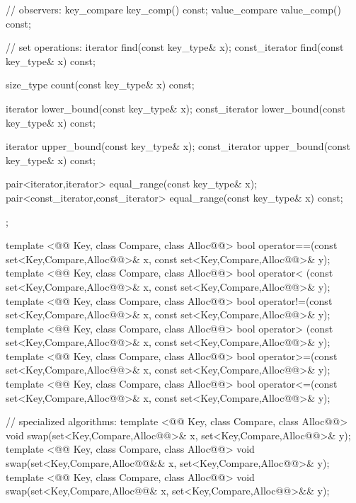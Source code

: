 \documentclass[american,twoside]{book}
\begin{document}
\begin{codeblock}
{{    // observers:
    key_compare   key_comp() const;
    value_compare value_comp() const;

    // set operations:
    iterator        find(const key_type& x);
    const_iterator  find(const key_type& x) const;

    size_type count(const key_type& x) const;

    iterator        lower_bound(const key_type& x);
    const_iterator  lower_bound(const key_type& x) const;

    iterator        upper_bound(const key_type& x);
    const_iterator  upper_bound(const key_type& x) const;

    pair<iterator,iterator>             equal_range(const key_type& x);
    pair<const_iterator,const_iterator> equal_range(const key_type& x) const;
  };

  template <@@ Key, class Compare, class Alloc@@>
    bool operator==(const set<Key,Compare,Alloc@@>& x,
                    const set<Key,Compare,Alloc@@>& y);
  template <@@ Key, class Compare, class Alloc@@>
    bool operator< (const set<Key,Compare,Alloc@@>& x,
                    const set<Key,Compare,Alloc@@>& y);
  template <@@ Key, class Compare, class Alloc@@>
    bool operator!=(const set<Key,Compare,Alloc@@>& x,
                    const set<Key,Compare,Alloc@@>& y);
  template <@@ Key, class Compare, class Alloc@@>
    bool operator> (const set<Key,Compare,Alloc@@>& x,
                    const set<Key,Compare,Alloc@@>& y);
  template <@@ Key, class Compare, class Alloc@@>
    bool operator>=(const set<Key,Compare,Alloc@@>& x,
                    const set<Key,Compare,Alloc@@>& y);
  template <@@ Key, class Compare, class Alloc@@>
    bool operator<=(const set<Key,Compare,Alloc@@>& x,
                    const set<Key,Compare,Alloc@@>& y);

  // specialized algorithms:
  template <@@ Key, class Compare, class Alloc@@>
    void swap(set<Key,Compare,Alloc@@>& x,
              set<Key,Compare,Alloc@@>& y);
  template <@@ Key, class Compare, class Alloc@@>
    void swap(set<Key,Compare,Alloc@@&& x,
              set<Key,Compare,Alloc@@>& y);
  template <@@ Key, class Compare, class Alloc@@>
    void swap(set<Key,Compare,Alloc@@& x,
              set<Key,Compare,Alloc@@>&& y);

}
\end{codeblock}
\end{document}
